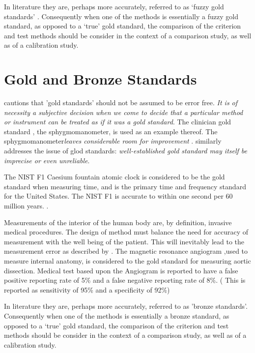 \documentclass[12pt, a4paper]{report}
\theoremstyle{plain}
\theoremstyle{definition}
\theoremstyle{remark}
\begin{document}
In literature they are, perhaps more accurately, referred to as
`fuzzy gold standards' \citep{phelps}. Consequently when one of the methods is
essentially a fuzzy gold standard, as opposed to a `true' gold
standard, the comparison of the criterion and test methods should
be consider in the context of a comparison study, as well as of a
calibration study.

	\section{Gold and Bronze Standards}
	
	\noindent \citet[p.47]{DunnSEME} cautions that 'gold standards' should not be assumed to be error free. \emph{It is of necessity a subjective decision when we come to decide that a particular method or instrument can be treated as if it was a gold standard}.
	The clinician gold standard , the sphygmomanometer, is used as an example thereof.  The sphygmomanometer\emph{leaves considerable room for improvement} \citep{DunnSEME}. \citet{pizzi} similarly addresses the issue of glod standards: \emph{well-established gold standard may itself be imprecise or even unreliable}.
	
	
	The NIST F1 Caesium fountain atomic clock is considered to be the gold standard when measuring time, and is the primary time and frequency standard for the United States. The NIST F1 is accurate
	to within one second per 60 million years. \citep{NIST}.
	
	Measurements of the interior of the human body are, by definition, invasive medical procedures. The design of method must balance the need for accuracy of measurement with the well being of the patient. This will inevitably lead to the measurement error as described by \citet{DunnSEME}. The magnetic resonance angiogram ,used to measure internal anatomy,  is considered to the gold standard for measuring aortic dissection. Medical test based upon the Angiogram is reported to have a false positive reporting rate of 5\% and a false negative reporting rate of 8\%. ( This is
	reported as sensitivity of 95\% and a specificity of 92\%)
	\citep{ACR}
	
	In literature they are, perhaps more accurately, referred to as
	'bronze standards'. Consequently when one of the methods is
	essentially a bronze standard, as opposed to a `true' gold
	standard, the comparison of the criterion and test methods should
	be consider in the context of a comparison study, as well as of a
	calibration study.
	
\end{document}
